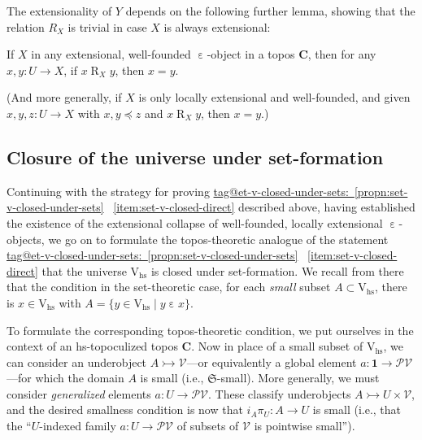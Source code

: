 \documentclass{amsart}
\makeatletter
\newcommand\bC{\mathbf{C}}
\newcommand\cV{\mathcal{V}}
\newcommand\ein{\mathrel{\varepsilon}}
\newcommand\fS{\mathfrak{S}}
\newcommand\hs{\mathrm{hs}}
\newcommand\pow{\mathcal{P}}
\newcommand\Rrel{\mathrel{R}}
\newcommand\rV{\mathrm{V}}
\newcommand\set[2][]{#1\{ #2 #1\}}
\newcommand\tm{\mathbf{1}}
\newcommand\tto{\rightarrowtail}
\newcommand\unein{{\ein}}
\newcommand\prooflabel[1]{\gdef\proof@label{#1}}
\def\proof@label{}
\newcommand\tagword[1]{\csname tag@#1\endcsname}
\def\label@tag#1:#2\@nil{#1}
\newcommand\labeltag[1]{\label@tag#1:\@nil}
\newcommand\jref[1]{%
  \texorpdfstring%
    {\hyperref[#1]{\tagword{\labeltag{#1}}~\ref*{#1}}}%
    {\tagword{\labeltag{#1}}~\ref*{#1}}%
}
\theoremstyle{definition}
\theoremstyle{remark}
\theoremstyle{plainwithref}
\makeatother
\begin{document}
\noindent
The extensionality of \( Y \) depends on the following further lemma, showing that the relation \( R_X \) is trivial in case \( X \) is always extensional:
\prooflabel{proof:if-ext-r-is-equality}
\begin{lem} \label{lem:if-ext-r-is-equality}
  If \( X \) in any extensional, well-founded \( \unein \)-object in a topos \( \bC \), then for any \( x,y \colon U \to X \), if \( x \Rrel_X y \), then \( x = y \).

  \noindent
  (And more generally, if \( X \) is only locally extensional and well-founded, and given \( x,y,z \colon U \to X \) with \( x,y \preceq z \) and \( x \Rrel_X y \), then \( x = y \).)
\end{lem}

\subsection{Closure of the universe under set-formation} \label{subsec:set-formation-closure}
Continuing with the strategy for proving \jref{propn:set-v-closed-under-sets}~\ref{item:set-v-closed-direct} described above, having established the existence of the extensional collapse of well-founded, locally extensional \( \unein \)-objects, we go on to formulate the topos-theoretic analogue of the statement \jref{propn:set-v-closed-under-sets}~\ref{item:set-v-closed-direct} that the universe \( \rV_\hs \) is closed under set-formation.
We recall from there that the condition in the set-theoretic case, for each \emph{small} subset \( A \subset \rV_\hs \), there is \( x \in \rV_\hs \) with \( A = \set{y \in \rV_\hs \mid y \ein x} \).

To formulate the corresponding topos-theoretic condition, we put ourselves in the context of an hs-topoculized topos \( \bC \).
Now in place of a small subset of \( \rV_\hs \), we can consider an underobject \( A \tto \cV \)---or equivalently a global element \( a \colon \tm \to \pow \cV \)---for which the domain \( A \) is small (i.e., \( \fS \)-small).
More generally, we must consider \emph{generalized} elements \( a \colon U \to \pow \cV \).
These classify underobjects \( A \tto U \times \cV \), and the desired smallness condition is now that \( i_A \pi_U \colon A \to U \) is small (i.e., that the ``\( U \)-indexed family \( a \colon U \to \pow \cV \) of subsets of \( \cV \) is pointwise small'').
\end{document}
